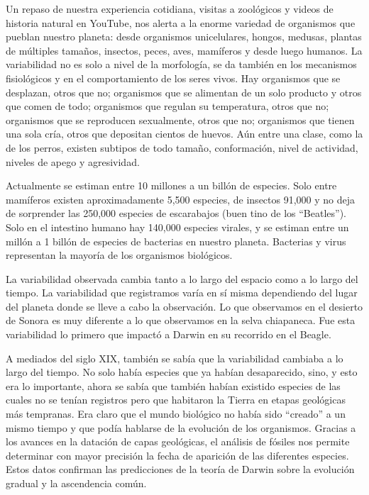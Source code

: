 \documentclass[
  letterpaper,
]{book}
\begin{document}
Un repaso de nuestra experiencia cotidiana, visitas a zoológicos y
videos de historia natural en YouTube, nos alerta a la enorme variedad
de organismos que pueblan nuestro planeta: desde organismos
unicelulares, hongos, medusas, plantas de múltiples tamaños, insectos,
peces, aves, mamíferos y desde luego humanos. La variabilidad no es solo
a nivel de la morfología, se da también en los mecanismos fisiológicos y
en el comportamiento de los seres vivos. Hay organismos que se
desplazan, otros que no; organismos que se alimentan de un solo producto
y otros que comen de todo; organismos que regulan su temperatura, otros
que no; organismos que se reproducen sexualmente, otros que no;
organismos que tienen una sola cría, otros que depositan cientos de
huevos. Aún entre una clase, como la de los perros, existen subtipos de
todo tamaño, conformación, nivel de actividad, niveles de apego y
agresividad.

Actualmente se estiman entre 10 millones a un billón de especies. Solo
entre mamíferos existen aproximadamente 5,500 especies, de insectos
91,000 y no deja de sorprender las 250,000 especies de escarabajos (buen
tino de los ``Beatles''). Solo en el intestino humano hay 140,000
especies virales, y se estiman entre un millón a 1 billón de especies de
bacterias en nuestro planeta. Bacterias y virus representan la mayoría
de los organismos biológicos.

La variabilidad observada cambia tanto a lo largo del espacio como a lo
largo del tiempo. La variabilidad que registramos varía en sí misma
dependiendo del lugar del planeta donde se lleve a cabo la observación.
Lo que observamos en el desierto de Sonora es muy diferente a lo que
observamos en la selva chiapaneca. Fue esta variabilidad lo primero que
impactó a Darwin en su recorrido en el Beagle.

A mediados del siglo XIX, también se sabía que la variabilidad cambiaba
a lo largo del tiempo. No solo había especies que ya habían
desaparecido, sino, y esto era lo importante, ahora se sabía que también
habían existido especies de las cuales no se tenían registros pero que
habitaron la Tierra en etapas geológicas más tempranas. Era claro que el
mundo biológico no había sido ``creado'' a un mismo tiempo y que podía
hablarse de la evolución de los organismos. Gracias a los avances en la
datación de capas geológicas, el análisis de fósiles nos permite
determinar con mayor precisión la fecha de aparición de las diferentes
especies. Estos datos confirman las predicciones de la teoría de Darwin
sobre la evolución gradual y la ascendencia común.
\end{document}
